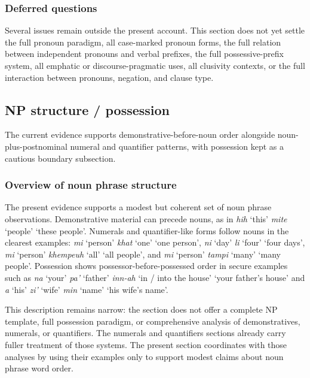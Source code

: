 \documentclass[
  11pt,
  a4paper,
]{article}
\newcommand{\tdim}[1]{\textit{#1}}
\newcommand{\glossquote}[1]{`#1'}
\begin{document}
\subsubsection{Deferred questions}\label{deferred-questions}

Several issues remain outside the present account. This section does not
yet settle the full pronoun paradigm, all case-marked pronoun forms, the
full relation between independent pronouns and verbal prefixes, the full
possessive-prefix system, all emphatic or discourse-pragmatic uses, all
clusivity contexts, or the full interaction between pronouns, negation,
and clause type.

\subsection{NP structure / possession}\label{np-structure-possession}

The current evidence supports demonstrative-before-noun order alongside
noun-plus-postnominal numeral and quantifier patterns, with possession
kept as a cautious boundary subsection.

\subsubsection{Overview of noun phrase
structure}\label{overview-of-noun-phrase-structure}

The present evidence supports a modest but coherent set of noun phrase
observations. Demonstrative material can precede nouns, as in \tdim{hih}
\glossquote{this} \tdim{mite} \glossquote{people}
\glossquote{these people}. Numerals and quantifier-like forms follow
nouns in the clearest examples: \tdim{mi} \glossquote{person}
\tdim{khat} \glossquote{one} \glossquote{one person}, \tdim{ni}
\glossquote{day} \tdim{li} \glossquote{four} \glossquote{four days},
\tdim{mi} \glossquote{person} \tdim{khempeuh} \glossquote{all}
\glossquote{all people}, and \tdim{mi} \glossquote{person} \tdim{tampi}
\glossquote{many} \glossquote{many people}. Possession shows
possessor-before-possessed order in secure examples such as \tdim{na}
\glossquote{your} \tdim{pa'} \glossquote{father} \tdim{inn-ah}
\glossquote{in / into the house} \glossquote{your father's house} and
\tdim{a} \glossquote{his} \tdim{zi'} \glossquote{wife} \tdim{min}
\glossquote{name} \glossquote{his wife's name}.

This description remains narrow: the section does not offer a complete
NP template, full possession paradigm, or comprehensive analysis of
demonstratives, numerals, or quantifiers. The numerals and quantifiers
sections already carry fuller treatment of those systems. The present
section coordinates with those analyses by using their examples only to
support modest claims about noun phrase word order.
\end{document}
